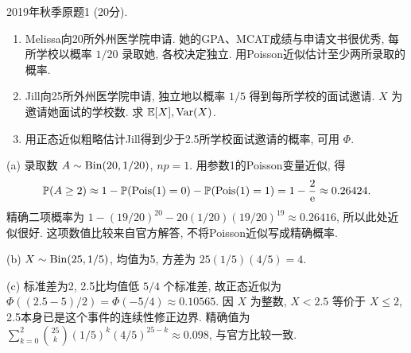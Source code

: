 \begin{exercise}\label{m2:2019f:q1}
2019年秋季原题1 (20分).
\begin{enumerate}
\item[(a)]\label{m2:2019f:q1:a} Melissa向20所外州医学院申请. 她的GPA、MCAT成绩与申请文书很优秀, 每所学校以概率 $1/20$ 录取她, 各校决定独立. 用Poisson近似估计至少两所录取的概率.
\item[(b)]\label{m2:2019f:q1:b} Jill向25所外州医学院申请, 独立地以概率 $1/5$ 得到每所学校的面试邀请. $X$ 为邀请她面试的学校数. 求 $\mathbb E[X],\operatorname{Var}(X)$.
\item[(c)]\label{m2:2019f:q1:c} 用正态近似粗略估计Jill得到少于2.5所学校面试邀请的概率, 可用 $\Phi$.
\end{enumerate}
\end{exercise}
\begin{solution}
(a) 录取数 $A\sim\operatorname{Bin}(20,1/20)$, $np=1$. 用参数1的Poisson变量近似, 得
\[
\mathbb P(A\ge2)\approx1-\mathbb P(\operatorname{Pois}(1)=0)-\mathbb P(\operatorname{Pois}(1)=1)=1-\frac2{\mathrm e}\approx0.26424.
\]
精确二项概率为 $1-(19/20)^{20}-20(1/20)(19/20)^{19}\approx0.26416$, 所以此处近似很好. 这项数值比较来自官方解答, 不将Poisson近似写成精确概率.

(b) $X\sim\operatorname{Bin}(25,1/5)$, 均值为5, 方差为 $25(1/5)(4/5)=4$.

(c) 标准差为2, 2.5比均值低 $5/4$ 个标准差, 故正态近似为 $\Phi((2.5-5)/2)=\Phi(-5/4)\approx0.10565$. 因 $X$ 为整数, $X<2.5$ 等价于 $X\le2$, 2.5本身已是这个事件的连续性修正边界. 精确值为 $\sum_{k=0}^2\binom{25}k(1/5)^k(4/5)^{25-k}\approx0.098$, 与官方比较一致.
\end{solution}

